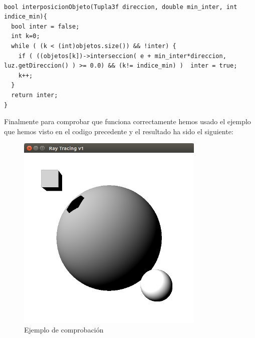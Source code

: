 \begin{lstlisting}[style=Consola]

bool interposicionObjeto(Tupla3f direccion, double min_inter, int indice_min){
  bool inter = false;
  int k=0;
  while ( (k < (int)objetos.size()) && !inter) {
    if ( ((objetos[k])->interseccion( e + min_inter*direccion, luz.getDireccion() ) >= 0.0) && (k!= indice_min) )  inter = true;
    k++;
  }
  return inter;
}
\end{lstlisting}



Finalmente para comprobar que funciona correctamente hemos usado el ejemplo que hemos visto en el codigo precedente y el resultado ha sido el siguiente:

\begin{figure}
	\begin{center}
		\includegraphics[width=0.8\textwidth]{imagenes/prueba.png}
	\end{center}
	\caption{Ejemplo de comprobación}
	\label{fig:etiq_9}
\end{figure}

